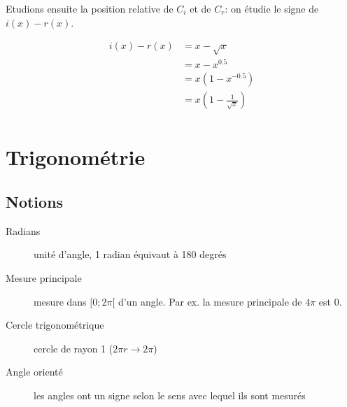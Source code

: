 \documentclass{article}
\begin{document}
Etudions ensuite la position relative de $C_i$ et de $C_r$: on étudie le signe de $i(x) - r(x)$.

\begin{align*}
	i(x) - r(x)&= x - \sqrt{x}  \\
	&= x - x^{0.5} \\
	&= x(1 - x^{-0.5}) \\
	&= x\left(1 - \frac{1}{\sqrt{x} }\right) \\
\end{align*}

\begin{center}
\end{center}


\newpage\section{Trigonométrie}
\subsection{Notions}
\begin{description}	
	\item[Radians] unité d'angle, 1 radian équivaut à 180 degrés
	\item[Mesure principale] mesure dans $[0; 2\pi[$ d'un angle. Par ex. la mesure principale de $4\pi$ est $0$.
	\item[Cercle trigonométrique] cercle de rayon 1 ($2\pi r \to 2\pi$)
	\item[Angle orienté] les angles ont un signe selon le sens avec lequel ils sont mesurés
\end{description}
\end{document}
